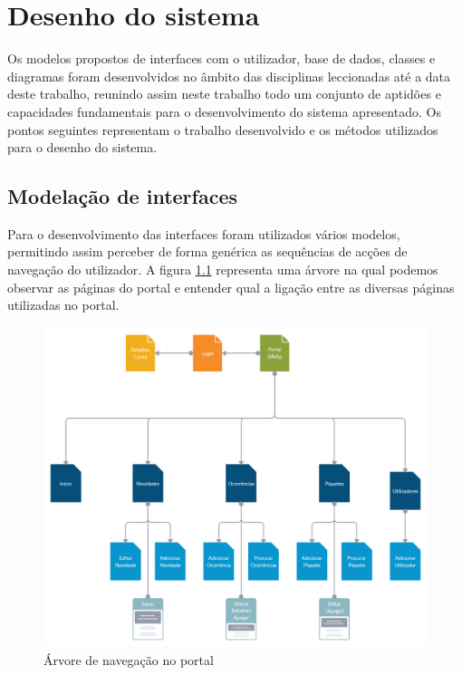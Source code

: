 \chapter{Desenho do sistema}
\label{cap3}

Os modelos propostos de interfaces com o utilizador, base de dados, classes e diagramas foram desenvolvidos no âmbito das disciplinas leccionadas até a data deste trabalho, reunindo assim neste trabalho todo um conjunto de aptidões e capacidades fundamentais para o desenvolvimento do sistema apresentado. Os pontos seguintes representam o trabalho desenvolvido e os métodos utilizados para o desenho do sistema.

\section{Modelação de interfaces}

Para o desenvolvimento das interfaces foram utilizados vários modelos, permitindo assim perceber de forma genérica as sequências de acções de navegação do utilizador. A figura \ref{fig:diagrama_arvore} representa uma árvore na qual podemos observar as páginas do portal e entender qual a ligação entre as diversas páginas utilizadas no portal.

\begin{figure}[!htb]
	\centering
	\includegraphics[width=\textwidth]{figuras/diagrama_arvore.png}
	\caption{Árvore de navegação no portal}
	\label{fig:diagrama_arvore}
\end{figure}

